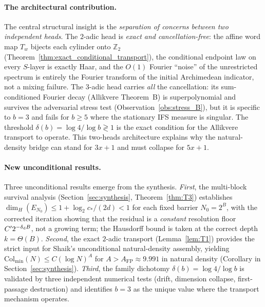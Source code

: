 \documentclass[12pt,a4paper]{article}
\begin{document}
\paragraph{The architectural contribution.}
The central structural insight is the \emph{separation of concerns between two
independent heads}.  The $2$-adic head is \emph{exact and cancellation-free}:
the affine word map $T_w$ bijects each cylinder onto $\mathbb{Z}_2$
(Theorem~\ref{thm:exact_conditional_transport}), the conditional endpoint law
on every $S$-layer is exactly Haar, and the $O(1)$ Fourier ``noise'' of the
unrestricted spectrum is entirely the Fourier transform of the initial
Archimedean indicator, not a mixing failure.  The $3$-adic head carries
\emph{all} the cancellation: its sum-conditioned Fourier decay
(Allikvere Theorem~B) is superpolynomial and survives the adversarial stress
test (Observation~\ref{obs:stress_B}), but it is specific to $b=3$ and fails
for $b\ge5$ where the stationary IFS measure is singular.  The threshold
$\delta(b)=\log4/\log b\gtrless1$ is the exact condition for the
Allikvere transport to operate.  This two-heads architecture explains why the
natural-density bridge can stand for $3x+1$ and must collapse for $5x+1$.

\paragraph{New unconditional results.}
Three unconditional results emerge from the synthesis.
\emph{First}, the multi-block survival analysis
(Section~\ref{sec:synthesis}, Theorem~\ref{thm:T3}) establishes
$\dim_H(E_{N_0})\le1+\log_2 c_*/(2d)<1$ for each fixed barrier $N_0=2^B$,
with the corrected iteration showing that the residual is a
\emph{constant} resolution floor $C'2^{-\delta_{\rm d}B}$, not a growing term; the
Hausdorff bound is taken at the correct depth $k=\Theta(B)$.
\emph{Second}, the exact $2$-adic transport (Lemma~\ref{lem:T1}) provides the
strict input for Shaik's unconditional natural-density assembly, yielding
$\mathrm{Col}_{\min}(N)\le C(\log N)^A$ for $A>A_{\mathrm{FP}}\approx9.991$
in natural density (Corollary in Section~\ref{sec:synthesis}).
\emph{Third}, the family dichotomy $\delta(b)=\log4/\log b$ is validated by
three independent numerical tests (drift, dimension collapse, first-passage
destruction) and identifies $b=3$ as the unique value where the transport
mechanism operates.
\end{document}
